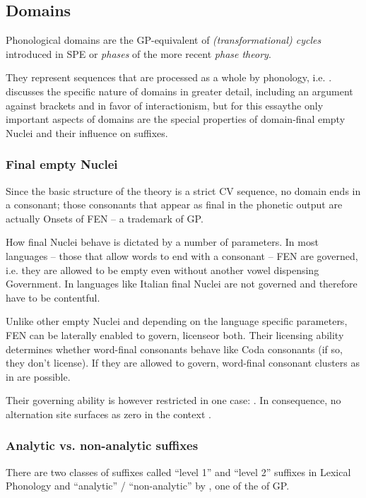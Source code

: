 \subsection{Domains}

Phonological domains are the \gls{GP}-equivalent of
\emph{(transformational) cycles} introduced in SPE \parencite{chomsky1968}
or \emph{phases} of the more recent \emph{phase theory}.

They represent sequences that are processed as a whole by phonology, i.e.
.
\Textcite{scheer2012} discusses the specific nature of domains in greater
detail, including an argument against brackets and in favor of
interactionism, but for this essay\co the only important aspects of
domains are the special properties of domain-final empty Nuclei and
their influence on suffixes.


\subsubsection{Final empty Nuclei}
Since the basic structure of the theory is a strict CV sequence,
no domain ends in a consonant; those consonants that appear as final
in the phonetic output are actually Onsets of \gls{FEN}
-- a trademark of \gls{GP}.

How final Nuclei behave is dictated by a number of parameters.
In most languages -- those that allow words to end with a consonant --
\gls{FEN} are governed, i.e. they are allowed to be empty even without
another vowel dispensing Government.
In languages like Italian final Nuclei are not governed and therefore
have to be contentful.

Unlike other empty Nuclei and depending on the language specific parameters,
\gls{FEN} can be laterally enabled to govern, license\co or both.
Their licensing ability determines whether word-final consonants behave
like Coda consonants (if so, they don't license).
If they are allowed to govern, word-final consonant clusters as in 
are possible. \parencite[appendix~1]{scheer2004}

Their governing ability is however restricted in one case:
.
In consequence, no alternation site surfaces as zero in the context
.


\subsubsection{Analytic vs. non-analytic suffixes}
There are two classes of suffixes called \enquote{level 1} and
\enquote{level 2} suffixes in Lexical Phonology and
\enquote{analytic} / \enquote{non-analytic} by ,
one of the  of \gls{GP}.

